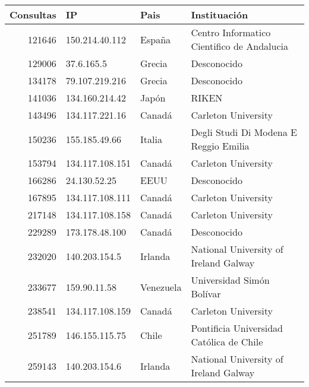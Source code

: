 \begin{table}[ht]
  \centering
  \begin{tabular}{|r|l|l|l|} \hline
    \bf{Consultas} & \bf{IP} & \bf{Pais} & \bf{Instituación} \\\hline
    121646  & 150.214.40.112  & España         
                   & Centro Informatico Cientifico de Andalucia\\\hline
    129006  & 37.6.165.5      & Grecia         
                   & Desconocido\\\hline
    134178  & 79.107.219.216  & Grecia         
                   & Desconocido\\\hline
    141036  & 134.160.214.42  & Japón          
                   & RIKEN\\\hline
    143496  & 134.117.221.16  & Canadá         
                   & Carleton University\\\hline
    150236  & 155.185.49.66   & Italia         
                   & Degli Studi Di Modena E Reggio Emilia\\\hline
    153794  & 134.117.108.151 & Canadá         
                   & Carleton University\\\hline
    166286  & 24.130.52.25    & EEUU 
                   & Desconocido\\\hline
    167895  & 134.117.108.111 & Canadá         
                   & Carleton University\\\hline
    217148  & 134.117.108.158 & Canadá         
                   & Carleton University\\\hline
    229289  & 173.178.48.100  & Canadá         
                   & Desconocido\\\hline
    232020  & 140.203.154.5   & Irlanda        
                   & National University of Ireland Galway\\\hline
    233677  & 159.90.11.58    & Venezuela      
                   & Universidad Simón Bolívar\\\hline
    238541  & 134.117.108.159 & Canadá         
                   & Carleton University\\\hline
    251789  & 146.155.115.75  & Chile          
                   & Pontificia Universidad Católica de Chile\\\hline
    259143  & 140.203.154.6   & Irlanda        
                   & National University of Ireland Galway\\\hline

\end{tabular}
\end{table}
